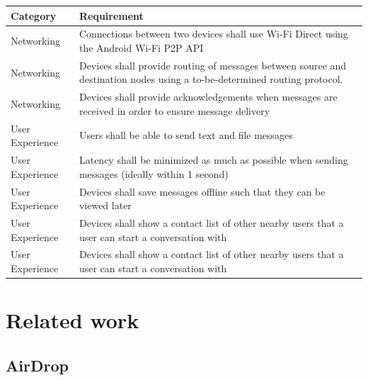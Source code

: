 \documentclass[10pt]{article}
\begin{document}
\begin{center}
    \begin{tabular}{| p{} | p{} |}
        \hline
        Category        & Requirement                                                                                                     \\ \hline
        Networking      & Connections between two devices shall use Wi-Fi Direct using the Android Wi-Fi P2P API                          \\ \hline
        Networking      & Devices shall provide routing of messages between source and destination nodes using a to-be-determined routing protocol. \\ \hline
        Networking      & Devices shall provide acknowledgements when messages are received in order to ensure message delivery           \\ \hline
        User Experience & Users shall be able to send text and file messages                                                              \\ \hline
        User Experience & Latency shall be minimized as much as possible when sending messages (ideally within 1 second)                  \\ \hline
        User Experience & Devices shall save messages offline such that they can be viewed later                                          \\ \hline
        User Experience & Devices shall show a contact list of other nearby users that a user can start a conversation with               \\ \hline
        User Experience & Devices shall show a contact list of other nearby users that a user can start a conversation with               \\ \hline
    \end{tabular}
\end{center}

\newpage

\section{Related work}

\subsection{AirDrop}
\end{document}
